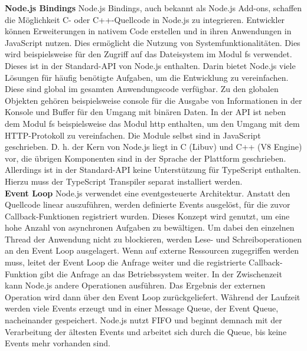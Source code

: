 \noindent
\textbf{Node.js Bindings} \newline
Node.js Bindings, auch bekannt als Node.js Add-ons, schaffen die Möglichkeit C- oder C++-Quellcode in Node.js zu integrieren. Entwickler können Erweiterungen in nativem Code erstellen und in ihren Anwendungen in JavaScript nutzen. Dies ermöglicht die Nutzung von Systemfunktionalitäten. Dies wird beispielsweise für den Zugriff auf das Dateisystem im Modul \glqq fs\grqq{} verwendet. Dieses ist in der Standard-API von Node.js enthalten. Darin bietet Node.js viele Lösungen für häufig benötigte Aufgaben, um die Entwicklung zu vereinfachen. Diese sind global im gesamten Anwendungscode verfügbar. Zu den globalen Objekten gehören beispielsweise \glqq console\grqq{} für die Ausgabe von Informationen in der Konsole und \glqq Buffer\grqq{} für den Umgang mit binären Daten. In der API ist neben dem Modul \glqq fs\grqq{} beispielsweise das Modul \glqq http\grqq{} enthalten, um den Umgang mit dem HTTP-Protokoll zu vereinfachen. Die Module selbst sind in JavaScript geschrieben. D. h. der Kern von Node.js liegt in C (Libuv) und C++ (V8 Engine)  vor, die übrigen Komponenten sind in der Sprache der Plattform geschrieben. Allerdings ist in der Standard-API keine Unterstützung für TypeScript enthalten. Hierzu muss der TypeScript Transpiler separat installiert werden.\cite{Springer.2022, OpenJSFoundation.2022b, OpenJSFoundation.o.J.b}\\

\noindent
\textbf{Event Loop} \newline
Node.js verwendet eine eventgesteuerte Architektur. Anstatt den Quellcode linear auszuführen, werden definierte Events ausgelöst, für die zuvor Callback-Funktionen registriert wurden. Dieses Konzept wird genutzt, um eine hohe Anzahl von asynchronen Aufgaben zu bewältigen. Um dabei den einzelnen Thread der Anwendung nicht zu blockieren, werden Lese- und Schreiboperationen an den Event Loop ausgelagert.  Wenn auf externe Ressourcen zugegriffen werden muss, leitet der Event Loop die Anfrage weiter und die registrierte Callback-Funktion gibt die Anfrage an das Betriebssystem weiter. In der Zwischenzeit kann Node.js andere Operationen ausführen. Das Ergebnis der externen Operation wird dann über den Event Loop zurückgeliefert.\cite{Springer.2022} \newline 
Während der Laufzeit werden viele Events erzeugt und in einer Message Queue, der Event Queue, nacheinander gespeichert. Node.js nutzt FIFO und beginnt demnach mit der Verarbeitung der ältesten Events und arbeitet sich durch die Queue, bis keine Events mehr vorhanden sind.\cite{OpenJSFoundation.o.J.c}\\

